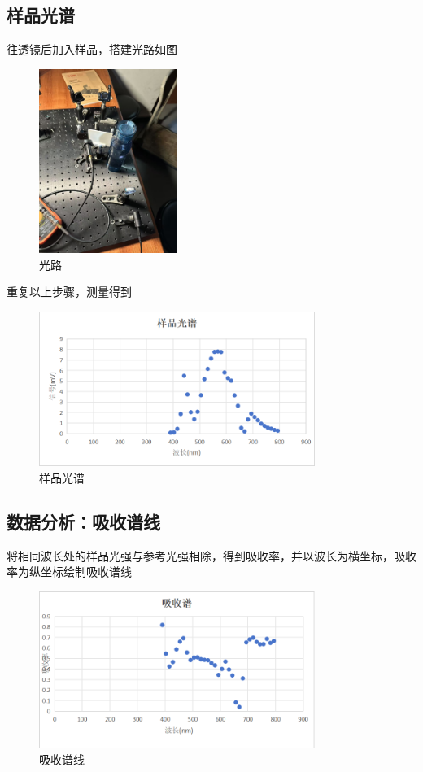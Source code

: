 \documentclass{ctexart}
\begin{document}
\subsection{样品光谱}
往透镜后加入样品，搭建光路如图
\begin{figure}
    \centering
    \includegraphics[width=0.4\textwidth]{pictures/微信图片_20241121154954.jpg}
    \caption{光路}
\end{figure}

重复以上步骤，测量得到
\begin{figure}[H]
    \centering
    \includegraphics[width=0.8\textwidth]{pictures/图片2.png}
    \caption{样品光谱}
\end{figure}

\subsection{数据分析：吸收谱线}
将相同波长处的样品光强与参考光强相除，得到吸收率，并以波长为横坐标，吸收率为纵坐标绘制吸收谱线
\begin{figure}[H]
    \centering
    \includegraphics[width=0.8\textwidth]{pictures/图片3.png}
    \caption{吸收谱线}
\end{figure}
\end{document}
